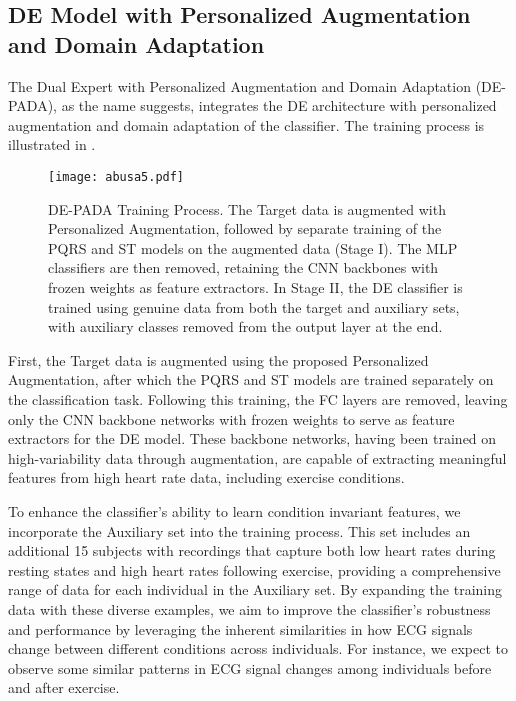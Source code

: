 \subsection{DE Model with Personalized Augmentation and Domain Adaptation}
\label{chap:dem_trainig}
The Dual Expert with Personalized Augmentation and Domain Adaptation (DE-PADA), as the name suggests, integrates the DE architecture with personalized augmentation and domain adaptation of the classifier. The training process is illustrated in .

\begin{figure}[!t]
\centering
\texttt{[image: abusa5.pdf]}
\caption[Overview of DE-PADA training process]
{
 DE-PADA Training Process. The Target data is augmented with Personalized Augmentation, followed by separate training of the PQRS and ST models on the augmented data (Stage I). The MLP classifiers are then removed, retaining the CNN backbones with frozen weights as feature extractors. In Stage II, the DE classifier is trained using genuine data from both the target and auxiliary sets, with auxiliary classes removed from the output layer at the end.
}
\label{fig:overall_methods}
\end{figure}

First, the Target data is augmented using the proposed Personalized Augmentation, after which the PQRS and ST models are trained separately on the classification task. Following this training, the FC layers are removed, leaving only the CNN backbone networks with frozen weights to serve as feature extractors for the DE model. These backbone networks, having been trained on high-variability data through augmentation, are capable of extracting meaningful features from high heart rate data, including exercise conditions.

To enhance the classifier's ability to learn condition invariant features, we incorporate the Auxiliary set into the training process. 
This set includes an additional 15 subjects with recordings that capture both low heart rates during resting states and high heart rates following exercise, providing a comprehensive range of data for each individual in the Auxiliary set.
By expanding the training data with these diverse examples, we aim to improve the classifier's robustness and performance by leveraging the inherent similarities in how ECG signals change between different conditions across individuals.
For instance, we expect to observe some similar patterns in ECG signal changes among individuals before and after exercise.

